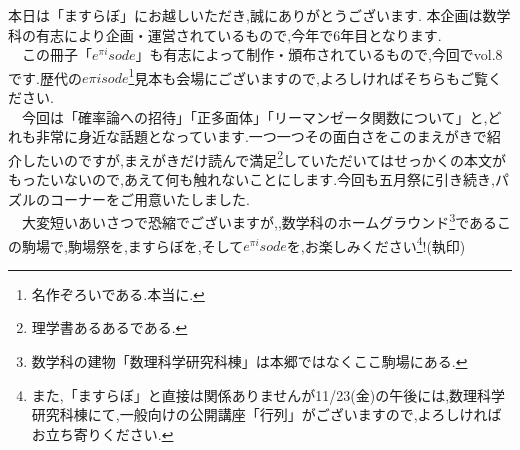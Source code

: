 
本日は「ますらぼ」にお越しいただき,誠にありがとうございます.
本企画は数学科の有志により企画・運営されているもので,今年で6年目となります.\\
　この冊子「$e^{\pi i}sode$」も有志によって制作・頒布されているもので,今回でvol.8です.歴代の$e{\pi i}sode$\footnote{名作ぞろいである.本当に.}見本も会場にございますので,よろしければそちらもご覧ください.\\
　今回は「確率論への招待」「正多面体」「リーマンゼータ関数について」と,どれも非常に身近な話題となっています.一つ一つその面白さをこのまえがきで紹介したいのですが,まえがきだけ読んで満足\footnote{理学書あるあるである.}していただいてはせっかくの本文がもったいないので,あえて何も触れないことにします.今回も五月祭に引き続き,パズルのコーナーをご用意いたしました.\\
　大変短いあいさつで恐縮でございますが,,数学科のホームグラウンド\footnote{数学科の建物「数理科学研究科棟」は本郷ではなくここ駒場にある.}であるこの駒場で,駒場祭を,ますらぼを,そして$e^{\pi i}sode$を,お楽しみください\footnote{また,「ますらぼ」と直接は関係ありませんが11/23(金)の午後には,数理科学研究科棟にて,一般向けの公開講座「行列」がございますので,よろしければお立ち寄りください.}!(執印)
